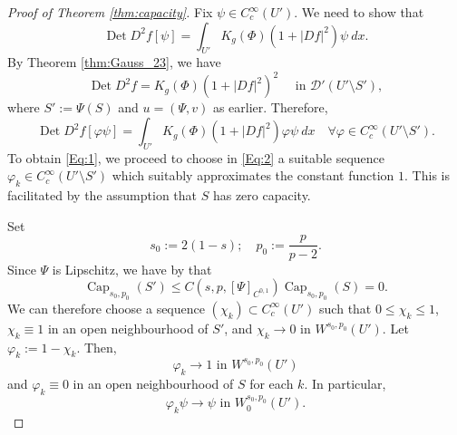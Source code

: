 \documentclass[12pt]{article}
\newcommand{\Det}{\operatorname{Det}}
\theoremstyle{plain}
\numberwithin{equation}{section}
\begin{document}
\begin{proof}[Proof of Theorem \ref{thm:capacity}] Fix $\psi \in C^\infty_c(U')$. We need to show that
    \begin{equation}
        \Det D^2 f[\psi] = \int_{U'} K_g(\Phi)(1+|Df|^2) \psi ~dx.
        \label{Eq:1}
    \end{equation}
    By Theorem \ref{thm:Gauss_23}, we have
    \begin{equation*}
        \Det D^2 f = K_g(\Phi)(1+|Df|^2)^2 \quad \text{ in } \mathcal{D}'(U'\setminus S'),
    \end{equation*}
    where $S' := \Psi(S)$ and $u = (\Psi,v)$ as earlier. Therefore,
    \begin{equation}
        \Det D^2 f[\varphi \psi] = \int_{U'} K_g(\Phi)(1+|Df|^2)\varphi \psi ~dx \quad \forall \varphi \in C^\infty_c(U'\setminus S').
        \label{Eq:2}
    \end{equation}
    To obtain \eqref{Eq:1}, we proceed to choose in \eqref{Eq:2} a suitable sequence $\varphi_k \in C^\infty_c(U'\setminus S')$ which suitably approximates the constant function $1$. This is facilitated by the assumption that $S$ has zero capacity.
    
    Set 
    \begin{equation} \label{eq:s0p0}
        s_0 := 2(1-s); \quad p_0 := \frac{p}{p-2}.
    \end{equation}
    Since $\Psi$ is Lipschitz, we have by {\cite[Theorem 5.2.1]{adams_hedberg}} that
    \begin{equation*}
        \operatorname{Cap}_{s_0,p_0}(S') \leq C(s,p,[\Psi]_{C^{0,1}}) \operatorname{Cap}_{s_0,p_0}(S) = 0.
    \end{equation*}
    We can therefore choose a sequence $(\chi_k) \subset C^\infty_c(U')$ such that $0\leq \chi_k \leq 1$, $\chi_k \equiv 1$ in an open neighbourhood of $S'$, and $\chi_k \to 0$ in $W^{s_0,p_0}(U')$. Let $\varphi_k := 1-\chi_k$. Then,
    \begin{equation*}
        \varphi_k \to 1 \text{ in } W^{s_0,p_0}(U')
    \end{equation*}
    and $\varphi_k \equiv 0$ in an open neighbourhood of $S$ for each $k$. In particular,
    \begin{equation*}
        \varphi_k \psi \to \psi \text{ in } W^{s_0,p_0}_0(U').
    \end{equation*}


\end{proof}
\end{document}
